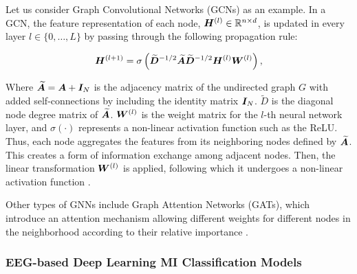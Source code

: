 Let us consider Graph Convolutional Networks (GCNs) as an example. In a GCN, the feature representation of each node, $\bm {H}^{(l)} \in \mathbb{R}^{n \times d}$, is updated in every layer $l \in \{0, \ldots, L\}$ by passing through the following propagation rule:

\begin{equation}
\bm {H}^{(l+1)} = \sigma\left(\widetilde{\bm {D}}^{-1/2}\widetilde{\bm {A}}\widetilde{\bm {D}}^{-1/2} \bm {H}^{(l)}\bm {W}^{(l)}\right),
\end{equation}

Where $\widetilde{\bm {A}} = \bm {A} + \bm {I}_N $ is the adjacency matrix of the undirected graph $G$ with added self-connections by including the identity matrix $\bm {I}_N$. $\widetilde{D}$ is the diagonal node degree matrix of $\widetilde{\bm {A}}$. $\bm {W}^{(l)}$ is the weight matrix for the $l$-th neural network layer, and $\sigma(\cdot)$ represents a non-linear activation function such as the ReLU. Thus, each node aggregates the features from its neighboring nodes defined by $\widetilde{\bm {A}}$. This creates a form of information exchange among adjacent nodes. Then, the linear transformation $\bm {W}^{(l)}$ is applied, following which it undergoes a non-linear activation function .

Other types of GNNs include Graph Attention Networks (GATs), which introduce an attention mechanism allowing different weights for different nodes in the neighborhood according to their relative importance . 

\subsubsection{EEG-based Deep Learning MI Classification Models}

